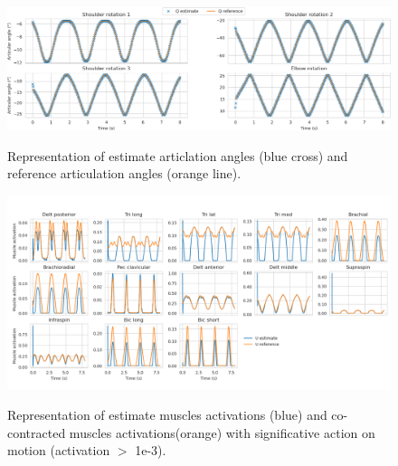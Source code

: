 \begin{figure}[t!]
\centering
\includegraphics[width=\textwidth]{figures/Articular_angle_MHE.png}\\
\caption{Representation of estimate articlation angles (blue cross) and reference articulation angles (orange line).}
\label{fig:angulare_angle_MHE}
\end{figure}
\begin{figure}[t!]
\centering
\includegraphics[width=\textwidth]{figures/Muscles_excitations_MHE.png}\\
\caption{Representation of estimate muscles activations (blue) and co-contracted muscles activations(orange) with significative action on motion (activation $>$ 1e-3).}
\label{fig:muscles_excitations_MHE}
\end{figure}

